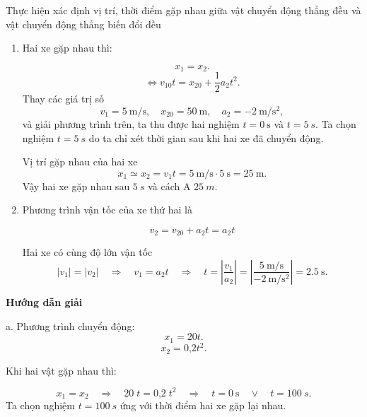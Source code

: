 \begin{dang}{Thực hiện xác định vị trí, thời điểm gặp nhau giữa vật chuyển động thẳng đều và vật chuyển động thẳng biến đổi đều}
{\begin{enumerate}[label=\alph*.]
			$$x_\text{1} = x_{10}+v_{1}t = v_{1}t.$$
			
			$$x_\text{2} = x_{20} + v_{20}t +\dfrac{1}{2}a_2t^2 = x_{20} +\dfrac{1}{2}a_2 t^2.$$
			\item Hai xe gặp nhau thì:
			
			$$x_{1} = x_{2}.$$
			$$\Leftrightarrow  v_{10}t= x_{20} +\dfrac{1}{2}a_2 t^2.$$
			Thay các giá trị số 
				$$v_{1}=\SI{5}{\meter/\second},\quad x_{20}=\SI{50}{\meter},\quad a_2=\SI{-2}{\meter/\second^{2}},$$
			và giải phương trình trên, ta thu được hai nghiệm $t=\SI{0}{\second}$ và $t =\SI{5}{s}.$ Ta chọn nghiệm $t =\SI{5}{s}$ do ta chỉ xét thời gian sau khi hai xe đã chuyển động. 
			
			Vị trí gặp nhau của hai xe
				$$x_1\simeq x_2=v_{1}t=\SI{5}{\meter/\second}\cdot\SI{5}{\second}=\SI{25}{\meter}.$$
			 Vậy hai xe gặp nhau sau $\SI{5}{s}$ và cách A $\SI{25}{m}.$
			 \item Phương trình vận tốc của xe thứ hai  là
			 
			 $$v_{2} = v_{20} +a_2t=a_2t$$
			 
			 Hai xe có cùng độ lớn vận tốc
			 $$\left|v_1\right|=\left|v_2\right|\quad\Rightarrow\quad v_1=a_2t\quad\Rightarrow\quad t=\left|\dfrac{v_1}{a_2}\right|=\left|\dfrac{\SI{5}{\meter/\second}}{\SI{-2}{\meter/\second^{2}}}\right|=\SI{2.5}{\second}.$$
		\end{enumerate}
	}
	{	\begin{center}
			\textbf{Hướng dẫn giải}
		\end{center}
		
		a. Phương trình chuyển động:
		$$x_1 = 20t.$$
		$$x_2 = \text{0,2}t^2.$$
		
		Khi hai vật gặp nhau thì:
		
		$$x_1 =x_2 \quad\Rightarrow\quad 20\;t = \text{0,2}\;t^2\quad\Rightarrow\quad t =\SI{0}{\second}\quad\vee\quad t =\SI{100}{s}.$$
		Ta chọn nghiệm $t =\SI{100}{s}$ ứng với thời điểm hai xe gặp lại nhau. 
		
}
\end{dang}
